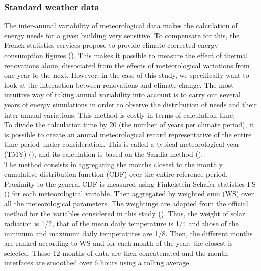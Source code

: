 \documentclass[11pt]{article}
\begin{document}

        \subsubsection{Standard weather data} %
        \label{ssub:standard_weather_data}
        
        The inter-annual variability of meteorological data makes the calculation of energy needs for a given building very sensitive. To compensate for this, the French statistics services propose to provide climate-corrected energy consumption figures (\cite{sdes_bilan_2023}). This makes it possible to measure the effect of thermal renovations alone, dissociated from the effects of meteorological variations from one year to the next. However, in the case of this study, we specifically want to look at the interaction between renovations and climate change. The most intuitive way of taking annual variability into account is to carry out several years of energy simulations in order to observe the distribution of needs and their inter-annual variations. This method is costly in terms of calculation time.\\

        To divide the calculation time by 20 (the number of years per climate period), it is possible to create an annual meteorological record representative of the entire time period under consideration. This is called a typical meteorological year (TMY) (\cite{wilcox_users_2008}), and its calculation is based on the Sandia method (\cite{hall_generation_1978}).\\

        The method consists in aggregating the months closest to the monthly cumulative distribution function (CDF) over the entire reference period. Proximity to the general CDF is measured using Finkelstein-Schafer statistics $\mathrm{FS}$ (\cite{finkelstein_improved_1971}) for each meteorological variable. Then aggregated by weighted sum ($\mathrm{WS}$) over all the meteorological parameters. The weightings are adapted from the official method for the variables considered in this study (\cite{wilcox_users_2008}). Thus, the weight of solar radiation is 1/2, that of the mean daily temperature is 1/4 and those of the minimum and maximum daily temperatures are 1/8.  Then, the different months are ranked according to $\mathrm{WS}$ and for each month of the year, the closest is selected. These 12 months of data are then concatenated and the month interfaces are smoothed over 6 hours using a rolling average. 
\end{document}
